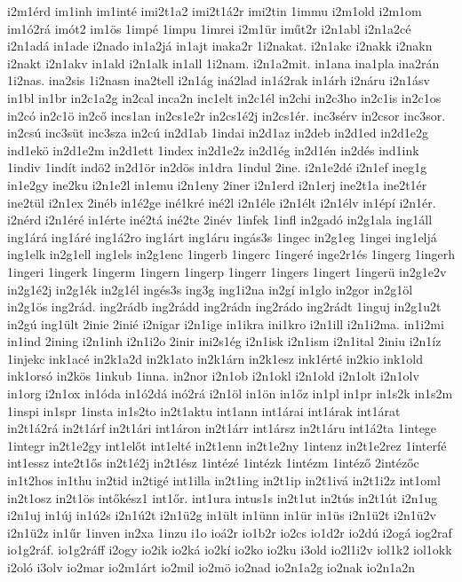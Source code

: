 {i2m1érd
im1inh
im1inté
imi2t1a2
imi2t1á2r
imi2tin
1immu
i2m1old
i2m1om
im1ó2rá
imót2
im1ös
1impé
1impu
1imrei
i2m1ür
iműt2r
i2n1abl
i2n1a2cé
i2n1adá
in1ade
i2nado
in1a2já
in1ajt
inaka2r
1i2nakat.
i2n1akc
i2nakk
i2nakn
i2nakt
i2n1akv
in1ald
i2n1alk
in1all
1i2nam.
i2n1a2mit.
in1ana
ina1pla
ina2rán
1i2nas.
ina2sis
1i2nasn
ina2tell
i2n1ág
iná2lad
in1á2rak
in1árh
i2náru
i2n1ásv
in1bl
in1br
in2c1a2g
in2cal
inca2n
inc1elt
in2c1él
in2chi
in2c3ho
in2c1is
in2c1os
in2có
in2c1ö
in2cő
incs1an
in2cs1e2r
in2cs1é2j
in2cs1ér.
inc3sérv
in2csor
inc3sor.
in2csú
inc3süt
inc3sza
in2cú
in2d1ab
1indai
in2d1az
in2deb
in2d1ed
in2d1e2g
ind1ekö
in2d1e2m
in2d1ett
1index
in2d1e2z
in2d1ég
in2d1én
in2dés
ind1ink
1indiv
1indít
indö2
in2d1ör
in2dös
in1dra
1indul
2ine.
i2n1e2dé
i2n1ef
ineg1g
in1e2gy
ine2ku
i2n1e2l
in1emu
i2n1eny
2iner
i2n1erd
i2n1erj
ine2t1a
ine2t1ér
ine2tül
i2n1ex
2inéb
in1é2ge
iné1kré
iné2l
i2n1éle
i2n1élt
i2n1élv
in1épí
i2n1ér.
i2nérd
i2n1éré
in1érte
iné2tá
iné2te
2inév
1infek
1infl
in2gadó
in2g1ala
ing1áll
ing1árá
ing1áré
ing1á2ro
ing1árt
ing1áru
ingás3s
1ingec
in2g1eg
1ingei
ing1eljá
ing1elk
in2g1ell
ing1els
in2g1enc
1ingerb
1ingerc
1ingeré
inge2r1és
1ingerg
1ingerh
1ingeri
1ingerk
1ingerm
1ingern
1ingerp
1ingerr
1ingers
1ingert
1ingerü
in2g1e2v
in2g1é2j
in2g1ék
in2g1él
ingés3s
ing3g
ing1i2na
in2gí
in1glo
in2gor
in2g1öl
in2g1ös
ing2rád.
ing2rádb
ing2rádd
ing2rádn
ing2rádo
ing2rádt
1inguj
in2g1u2t
in2gú
ing1ült
2inie
2inié
i2nigar
i2n1ige
in1ikra
ini1kro
i2n1ill
i2n1i2ma.
in1i2mi
in1ind
2ining
i2n1inh
i2n1i2o
2inir
ini2s1ég
i2n1isk
i2n1ism
i2n1ital
2iniu
i2n1íz
1injekc
ink1acé
in2k1a2d
in2k1ato
in2k1árn
in2k1esz
ink1érté
in2kio
ink1old
ink1orsó
in2kös
1inkub
1inna.
in2nor
i2n1ob
i2n1okl
i2n1old
i2n1olt
i2n1olv
in1org
i2n1ox
in1óda
in1ó2dá
inó2rá
i2n1öl
in1ön
in1őz
in1pl
in1pr
in1s2k
in1s2m
1inspi
in1spr
1insta
in1s2to
in2t1aktu
int1ann
int1árai
int1árak
int1árat
in2t1á2rá
in2t1árf
in2t1ári
int1áron
in2t1árr
int1ársz
in2t1áru
int1á2ta
1intege
1integr
in2t1e2gy
int1előt
int1elté
in2t1enn
in2t1e2ny
1intenz
in2t1e2rez
1interfé
int1essz
inte2t1ős
in2t1é2j
in2t1ész
1intézé
1intézk
1intézm
1intéző
2intézőc
in1t2hos
in1thu
in2tid
in2tigé
int1illa
in2t1ing
in2t1ip
in2t1ivá
in2t1i2z
int1oml
in2t1osz
in2t1ös
intőkész1
int1őr.
int1ura
intus1s
in2t1ut
in2tús
in2t1út
i2n1ug
i2n1uj
in1új
in1ú2s
i2n1ú2t
i2n1ü2g
in1ült
in1ünn
in1ür
in1üs
i2n1ü2t
i2n1ü2v
i2n1ü2z
in1űr
1inven
in2xa
1inzu
i1o
ioá2r
io1b2r
io2cs
io1d2r
io2dú
i2ogá
iog2raf
io1g2ráf.
io1g2ráff
i2ogy
io2ik
io2ká
io2kí
io2ko
io2ku
i3old
io2l1i2v
iol1k2
iol1okk
i2oló
i3olv
io2mar
io2m1árt
io2mil
io2mö
io2nad
io2n1a2g
io2nak
io2n1a2n
}

